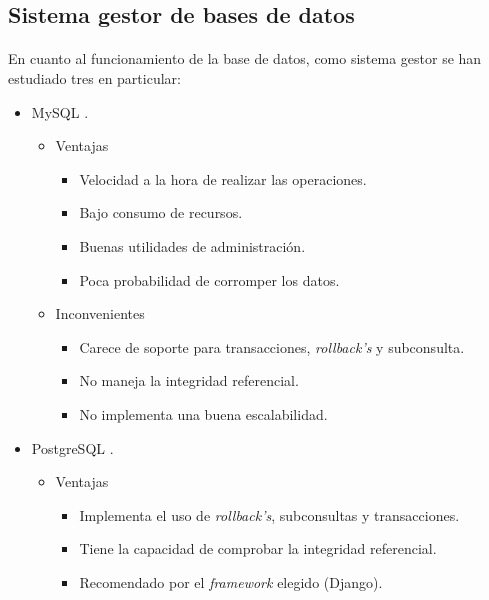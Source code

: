 \subsection{Sistema gestor de bases de datos}
   \paragraph{}En cuanto al funcionamiento de la base de datos, como sistema
   gestor se han estudiado tres en particular:

   \begin{itemize}
    \item MySQL \cite{mysql}.
      \begin{itemize}
         \item Ventajas
            \begin{itemize}
             \item Velocidad a la hora de realizar las operaciones.
             \item Bajo consumo de recursos.
             \item Buenas utilidades de administración.
             \item Poca probabilidad de corromper los datos.
            \end{itemize}
         \item Inconvenientes
            \begin{itemize}
             \item Carece de soporte para transacciones, \textit{rollback's} y
                   subconsulta.
             \item No maneja la integridad referencial.
             \item No implementa una buena escalabilidad.
            \end{itemize}
      \end{itemize}
    \item PostgreSQL \cite{postgresql}.
      \begin{itemize}
         \item Ventajas
            \begin{itemize}
             \item Implementa el uso de \textit{rollback's}, subconsultas y
                   transacciones.
             \item Tiene la capacidad de comprobar la integridad referencial.
             \item Recomendado por el \textit{framework} elegido (Django).
            \end{itemize}

\end{itemize}
\end{itemize}
